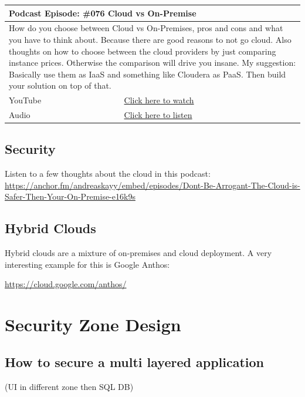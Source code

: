 \documentclass[12pt, numbers=noenddot]{scrreprt} %
\begin{document}
\begin{table}[h]
\begin{tabular}{ll}
\hline
\multicolumn{2}{l}{\textbf{Podcast Episode:} \#076 Cloud vs On-Premise} \\ \hline
\multicolumn{2}{p{15cm}}{How do you choose between Cloud vs On-Premises, pros and cons and what you have to think about. Because there are good reasons to not go cloud.
Also thoughts on how to choose between the cloud providers by just comparing instance prices. Otherwise the comparison will drive you insane.
My suggestion: Basically use them as IaaS and something like Cloudera as PaaS. Then build your solution on top of that.  }         \\ \hline
\multicolumn{1}{l|}{YouTube}   & \href{https://youtu.be/BAzj0yGcrnE}{Click here to watch}   \\ 
\multicolumn{1}{l|}{Audio}     & \href{https://anchor.fm/andreaskayy/episodes/076-Cloud-vs-On-Premise-How-To-Decide-e45ivk}{Click here to listen}   \\ \hline
\end{tabular}
\end{table}

\section{Security}


Listen to a few thoughts about the cloud in this podcast: 
\url{https://anchor.fm/andreaskayy/embed/episodes/Dont-Be-Arrogant-The-Cloud-is-Safer-Then-Your-On-Premise-e16k9s}

\section{Hybrid Clouds}

Hybrid clouds are a mixture of on-premises and cloud deployment. A very interesting example for this is Google Anthos:

\url{https://cloud.google.com/anthos/}

\chapter{Security Zone Design}
\section{How to secure a multi layered application}
(UI in different zone then SQL DB)
\end{document}
